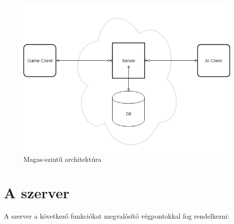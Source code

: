 \documentclass[twoside, a4paper, 12pt]{book}
\begin{document}
\begin{figure}[htbp]
	\centering
	\includegraphics[width=1.0\textwidth]{img/highLevelArchitecture.png}
	\caption{Magas-szintű architektúra}
	\label{fig:highLevelArchitecture}
\end{figure}

\section{A szerver}

A szerver a következő funkciókat megvalósító végpontokkal fog rendelkezni:
\end{document}
